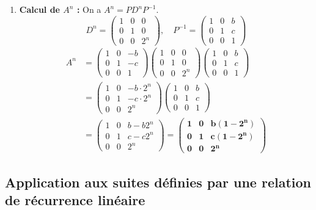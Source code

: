 \documentclass[french]{yLectureNote}
\begin{document}
\begin{enumerate}
\begin{enumerate}
        \item \textbf{Calcul de $A^{n}$ :}
        On a $A^n = P D^n P^{-1}$.
        $$D^n = \begin{pmatrix} 1&0&0\\ 0&1&0\\ 0&0&2^n \end{pmatrix}, \quad P^{-1} = \begin{pmatrix} 1&0&b\\ 0&1&c\\ 0&0&1 \end{pmatrix}$$
        \begin{align*}
        A^n &= \begin{pmatrix} 1&0&-b\\ 0&1&-c\\ 0&0&1 \end{pmatrix} \begin{pmatrix} 1&0&0\\ 0&1&0\\ 0&0&2^n \end{pmatrix} \begin{pmatrix} 1&0&b\\ 0&1&c\\ 0&0&1 \end{pmatrix} \\
        &= \begin{pmatrix} 1&0&-b \cdot 2^n\\ 0&1&-c \cdot 2^n\\ 0&0&2^n \end{pmatrix} \begin{pmatrix} 1&0&b\\ 0&1&c\\ 0&0&1 \end{pmatrix} \\
        &= \begin{pmatrix} 1 & 0 & b - b 2^n \\ 0 & 1 & c - c 2^n \\ 0 & 0 & 2^n \end{pmatrix} = \mathbf{\begin{pmatrix} 1 & 0 & b(1 - 2^n) \\ 0 & 1 & c(1 - 2^n) \\ 0 & 0 & 2^n \end{pmatrix}}
        \end{align*}
    \end{enumerate}
\end{enumerate}

\subsection{Application aux suites définies par une relation de récurrence linéaire}
\end{document}
